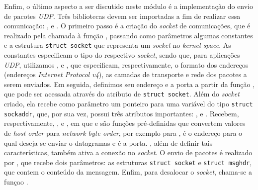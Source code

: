 Enfim, o último aspecto a ser discutido neste módulo é a implementação do envio
de pacotes \textit{UDP}. Três bibliotecas devem ser importadas a fim de realizar
essa comunicação: ,  e
. O primeiro passo é a criação do \textit{socket} de
comunicações, que é realizado pela chamada à função ,
passando como parâmetros algumas constantes e a estrutura \texttt{struct socket}
que representa um \textit{socket} no \textit{kernel space}. As constantes
especificam o tipo do respectivo \textit{socket}, sendo que, para aplicações
\textit{UDP}, utilizamos ,  e ,
que especificam, respectivamente, o formato dos endereços (endereços
\textit{Internet Protocol v4}), as camadas de transporte e rede dos pacotes a
serem enviados. Em seguida, definimos seu endereço e a porta a partir da função
, que pode ser acessada através do atributo  de
\texttt{struct socket}. Além do \textit{socket} criado, ela recebe como
parâmetro um ponteiro para uma variável do tipo \texttt{struct sockaddr}, que,
por sua vez, possui três atributos importantes: ,
 e . Recebem, respectivamente,
,  e , em que
 e  são funções pré-definidas que convertem valores
de \textit{host order} para \textit{network byte order}, por exemplo
 para ,  é o endereço para
o qual deseja-se enviar o datagramas e  é a porta.
, além de definir tais características, também ativa a conexão
no \textit{socket}. O envio de pacotes é realizado por ,
que recebe dois parâmetros: as estruturas \texttt{struct socket} e
\texttt{struct msghdr}, que contem o conteúdo da mensagem. Enfim, para desalocar
o \textit{socket}, chama-se a funçao .

% 
% 
%  

